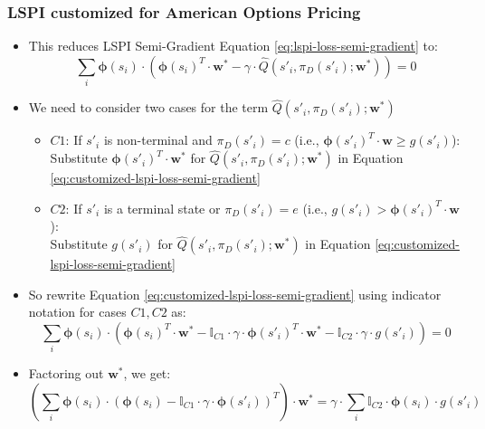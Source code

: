 \documentclass{beamer}
\begin{document}
\begin{frame}
\frametitle{LSPI customized for American Options Pricing}
\pause
\begin{itemize}[<+->]
\item This reduces LSPI Semi-Gradient Equation \eqref{eq:lspi-loss-semi-gradient} to:
\begin{equation}
\sum_i \bm{\phi}(s_i) \cdot (\bm{\phi}(s_i)^T \cdot \bm{w}^* - \gamma \cdot \hat{Q}(s'_i, \pi_D(s'_i); \bm{w}^*)) = 0
\label{eq:customized-lspi-loss-semi-gradient}
\end{equation}
\item We need to consider two cases for the term $\hat{Q}(s'_i, \pi_D(s'_i); \bm{w}^*)$
\begin{itemize} 
\item  $C1$: If $s'_i$ is non-terminal and $\pi_D(s'_i) = c$ (i.e., $\bm{\phi}(s'_i)^T \cdot \bm{w} \geq g(s'_i)$):\\
Substitute $\bm{\phi}(s'_i)^T \cdot \bm{w}^*$ for $\hat{Q}(s'_i,\pi_D(s'_i); \bm{w}^*)$ in Equation \eqref{eq:customized-lspi-loss-semi-gradient}
\item $C2$: If $s'_i$ is a terminal state or $\pi_D(s'_i) = e$ (i.e., $g(s'_i) > \bm{\phi}(s'_i)^T \cdot \bm{w}$):\\
Substitute $g(s'_i)$ for $\hat{Q}(s'_i,\pi_D(s'_i); \bm{w}^*)$ in Equation \eqref{eq:customized-lspi-loss-semi-gradient}
\end{itemize}
\item So rewrite Equation \eqref{eq:customized-lspi-loss-semi-gradient} using indicator notation for cases $C1, C2$ as:
$$\sum_i \bm{\phi}(s_i) \cdot (\bm{\phi}(s_i)^T \cdot \bm{w}^* - \mathbb{I}_{C1} \cdot \gamma \cdot \bm{\phi}(s'_i)^T \cdot \bm{w}^*  -  \mathbb{I}_{C2} \cdot \gamma \cdot g(s'_i)) = 0$$
\item Factoring out $\bm{w}^*$, we get:
$$(\sum_i \bm{\phi}(s_i) \cdot (\bm{\phi}(s_i) - \mathbb{I}_{C1} \cdot \gamma \cdot \bm{\phi}(s'_i))^T) \cdot \bm{w}^*= \gamma \cdot \sum_i  \mathbb{I}_{C2} \cdot \bm{\phi}(s_i) \cdot g(s'_i)$$


\end{itemize}
\end{frame}
\end{document}
